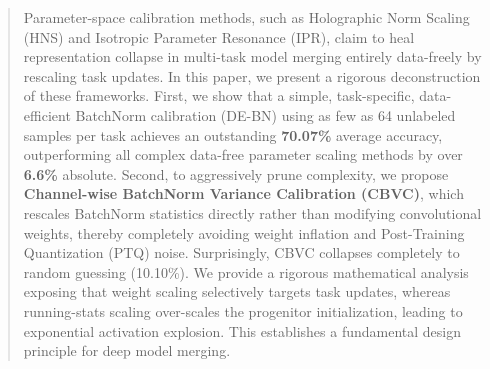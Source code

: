 \documentclass{article}
\begin{document}

\printAffiliationsAndNotice{}

\begin{abstract}
Parameter-space calibration methods, such as Holographic Norm Scaling (HNS) and Isotropic Parameter Resonance (IPR), claim to heal representation collapse in multi-task model merging entirely data-freely by rescaling task updates. In this paper, we present a rigorous deconstruction of these frameworks. First, we show that a simple, task-specific, data-efficient BatchNorm calibration (DE-BN) using as few as 64 unlabeled samples per task achieves an outstanding \textbf{70.07\%} average accuracy, outperforming all complex data-free parameter scaling methods by over \textbf{6.6\%} absolute. Second, to aggressively prune complexity, we propose \textbf{Channel-wise BatchNorm Variance Calibration (CBVC)}, which rescales BatchNorm statistics directly rather than modifying convolutional weights, thereby completely avoiding weight inflation and Post-Training Quantization (PTQ) noise. Surprisingly, CBVC collapses completely to random guessing (10.10\%). We provide a rigorous mathematical analysis exposing that weight scaling selectively targets task updates, whereas running-stats scaling over-scales the progenitor initialization, leading to exponential activation explosion. This establishes a fundamental design principle for deep model merging.
\end{abstract}
\end{document}
